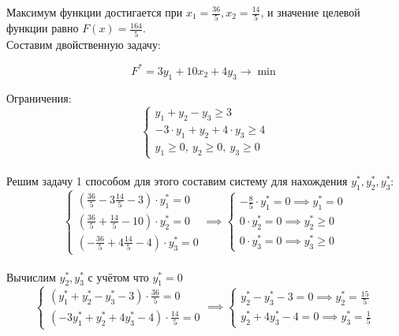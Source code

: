 \documentclass{article}
\begin{document}
Максимум функции достигается при \(x_1 = \frac{36}{5}, x_2 = \frac{14}{5}\), и значение целевой функции равно \(F(x) = \frac{164}{5}\).\\

Составим двойственную задачу:

\[
    F^* = 3y_1 + 10x_2 + 4y_3 \to \min
\]

Ограничения:
\[
    \begin{cases}
        y_1 + y_2 - y_3 \geq 3                  \\
        -3 \cdot y_1 + y_2 + 4 \cdot y_3 \geq 4 \\
        y_1 \geq 0, \ y_2 \geq 0, \ y_3 \geq 0
    \end{cases}
\]\\

Решим задачу 1 способом для этого составим систему для нахождения \(y_1^*, y_2^*, y_3^*\):\\

\[
    \begin{cases}
        (\frac{36}{5} - 3\frac{14}{5} - 3) \cdot y_1^* = 0 \\
        (\frac{36}{5} + \frac{14}{5} - 10) \cdot y_2^* = 0 \\
        (-\frac{36}{5} + 4\frac{14}{5} - 4) \cdot y_3^* = 0
    \end{cases} \implies
    \begin{cases}
        -\frac{8}{5} \cdot y_1^* = 0 \implies y_1^* = 0 \\
        0 \cdot y_2^* = 0 \implies y_2^* \geq 0         \\
        0 \cdot y_3^* = 0 \implies y_3^* \geq 0
    \end{cases}
\]\\

Вычислим \(y_2^*, y_3^*\) с учётом что \(y_1^* = 0\)\\

\[
    \begin{cases}
        (y_1^* + y_2^* - y_3^* - 3) \cdot \frac{36}{5} = 0 \\
        (-3y_1^* + y_2^* + 4y_3^* - 4) \cdot \frac{14}{5} = 0
    \end{cases} \implies
    \begin{cases}
        y_2^* - y_3^* - 3 = 0 \implies y_2^* = \frac{15}{5} \\
        y_2^* + 4y_3^* - 4 = 0 \implies y_3^* = \frac{1}{5}
    \end{cases}
\]\\
\end{document}
